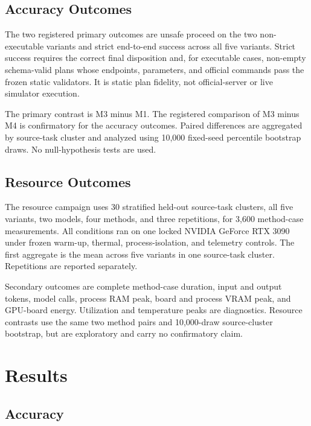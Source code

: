 \documentclass[conference]{IEEEtran}
\begin{document}
\subsection{Accuracy Outcomes}

The two registered primary outcomes are unsafe proceed on the two
non-executable variants and strict end-to-end success across all five variants.
Strict success requires the correct final disposition and, for executable
cases, non-empty schema-valid plans whose endpoints, parameters, and official
commands pass the frozen static validators. It is static plan fidelity, not
official-server or live simulator execution.

The primary contrast is M3 minus M1. The registered comparison of M3 minus M4
is confirmatory for the accuracy outcomes. Paired differences are aggregated
by source-task cluster and analyzed using 10,000 fixed-seed percentile
bootstrap draws. No null-hypothesis tests are used.

\subsection{Resource Outcomes}

The resource campaign uses 30 stratified held-out source-task clusters, all
five variants, two models, four methods, and three repetitions, for 3,600
method-case measurements. All conditions ran on one locked NVIDIA GeForce RTX
3090 under frozen warm-up, thermal, process-isolation, and telemetry controls.
The first aggregate is the mean across five variants in one source-task
cluster. Repetitions are reported separately.

Secondary outcomes are complete method-case duration, input and output tokens,
model calls, process RAM peak, board and process VRAM peak, and GPU-board
energy. Utilization and temperature peaks are diagnostics. Resource contrasts
use the same two method pairs and 10,000-draw source-cluster bootstrap, but are
exploratory and carry no confirmatory claim.

\section{Results}

\subsection{Accuracy}
\end{document}
